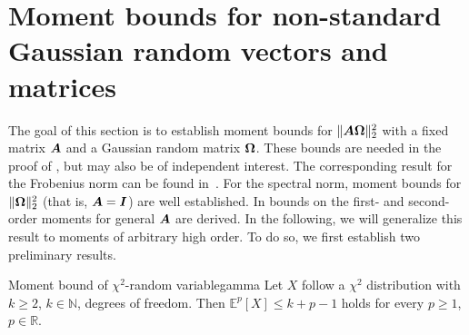 \appendix

\color{blue}
\section{Moment bounds for non-standard Gaussian random vectors and matrices}

The goal of this section is to establish moment bounds for $\lVert \boldsymbol{A} \boldsymbol{\Omega} \rVert _2^2$ with a fixed matrix $\boldsymbol{A}$ and a Gaussian random matrix $\boldsymbol{\Omega}$. These bounds are needed in the proof of , but may also be of independent interest.
The corresponding result for the Frobenius norm can be found in~\cite[Lemma 3]{kressner-2024-randomized-lowrank}. For the spectral norm, moment bounds for $\lVert \boldsymbol{\Omega} \rVert _2^2$ (that is, $\boldsymbol{A} = \boldsymbol{I}$) are well established\cite{chen-2005-condition-numbers, edelman-1988-eigenvalues-condition, james-1964-distributions-matrix}. In \cite[Lemma B.1]{tropp-2023-randomized-algorithms} bounds on the first- and second-order moments for general $\boldsymbol{A}$ are derived. In the following, we will generalize this result to moments of arbitrary high order. To do so, we first establish two preliminary results.

\begin{lemma}{Moment bound of $\chi^2$-random variable}{gamma}
    Let $X$ follow a $\chi^2$ distribution with $k \ge 2$, $k\in \mathbb{N}$, degrees of freedom. Then 
    $
        \mathbb{E}^{{p}}[X] \leq k + p-1
    $ holds for every $p \ge 1$, $p\in \mathbb R$.
\end{lemma}

